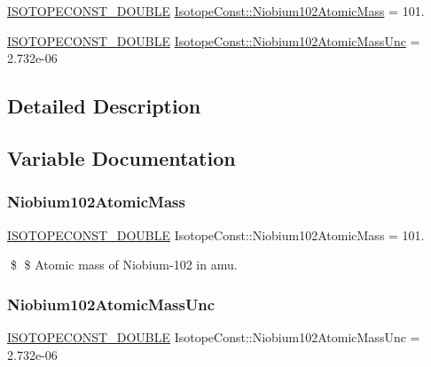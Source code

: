 \begin{DoxyCompactItemize}
\item 
\mbox{\hyperlink{group___isotope_const-_macros_ga8f45a7272ce02c0b4c65c44636ed719a}{I\+S\+O\+T\+O\+P\+E\+C\+O\+N\+S\+T\+\_\+\+D\+O\+U\+B\+LE}} \mbox{\hyperlink{group___isotope_const-_niobium-_nb102_ga6b7f85c2759100db3c36cb0f0a4e44a7}{Isotope\+Const\+::\+Niobium102\+Atomic\+Mass}} = 101.
\item 
\mbox{\hyperlink{group___isotope_const-_macros_ga8f45a7272ce02c0b4c65c44636ed719a}{I\+S\+O\+T\+O\+P\+E\+C\+O\+N\+S\+T\+\_\+\+D\+O\+U\+B\+LE}} \mbox{\hyperlink{group___isotope_const-_niobium-_nb102_ga79da7aacd3e096f915f45c389c5000a7}{Isotope\+Const\+::\+Niobium102\+Atomic\+Mass\+Unc}} = 2.\+732e-\/06
\end{DoxyCompactItemize}


\subsection{Detailed Description}


\subsection{Variable Documentation}
\mbox{\label{group___isotope_const-_niobium-_nb102_ga6b7f85c2759100db3c36cb0f0a4e44a7}} 
\subsubsection{\texorpdfstring{Niobium102\+Atomic\+Mass}{Niobium102AtomicMass}}
{\footnotesize\ttfamily \mbox{\hyperlink{group___isotope_const-_macros_ga8f45a7272ce02c0b4c65c44636ed719a}{I\+S\+O\+T\+O\+P\+E\+C\+O\+N\+S\+T\+\_\+\+D\+O\+U\+B\+LE}} Isotope\+Const\+::\+Niobium102\+Atomic\+Mass = 101.}

\$ \$ Atomic mass of Niobium-\/102 in amu. \mbox{\label{group___isotope_const-_niobium-_nb102_ga79da7aacd3e096f915f45c389c5000a7}} 
\subsubsection{\texorpdfstring{Niobium102\+Atomic\+Mass\+Unc}{Niobium102AtomicMassUnc}}
{\footnotesize\ttfamily \mbox{\hyperlink{group___isotope_const-_macros_ga8f45a7272ce02c0b4c65c44636ed719a}{I\+S\+O\+T\+O\+P\+E\+C\+O\+N\+S\+T\+\_\+\+D\+O\+U\+B\+LE}} Isotope\+Const\+::\+Niobium102\+Atomic\+Mass\+Unc = 2.\+732e-\/06}

